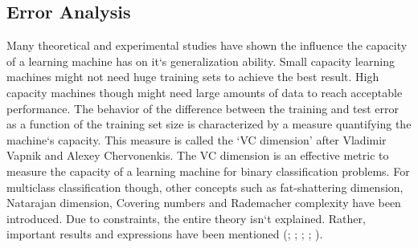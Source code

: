 \documentclass[letterpaper,12pt, onecolumn]{article}%
\begin{document}
\subsection{Error Analysis}
Many theoretical and experimental studies have shown the influence the capacity of a learning machine has on it`s generalization ability. Small capacity learning machines might not need huge training sets to achieve the best result. High capacity machines though might need large amounts of data to reach acceptable performance. The behavior of the difference between the training and test error as a function of the training set size is characterized by a measure quantifying the machine`s capacity. This measure is called the \enquote*{VC dimension} after Vladimir Vapnik and Alexey Chervonenkis. The VC dimension is an effective metric to measure the capacity of a learning machine for binary classification problems. For multiclass classification though, other concepts such as fat-shattering dimension, Natarajan dimension, Covering numbers and Rademacher complexity have been introduced. Due to constraints, the entire theory isn`t explained. Rather, important results and expressions have been mentioned (\cite{vapnik1971uniform}; \cite{haussler1995generalization}; \cite{tewari13learning}; \cite{abu2012learning}; \cite{murphy2012machine}).
\end{document}
